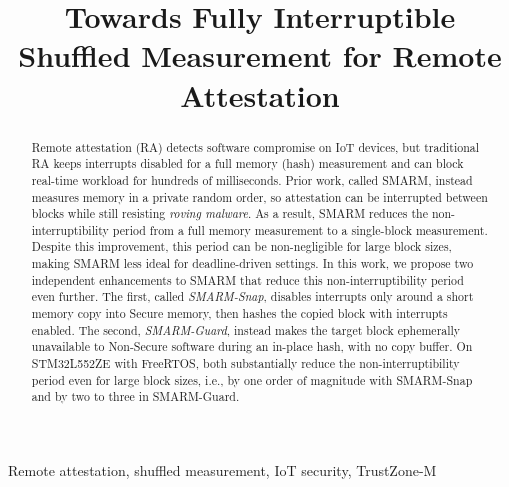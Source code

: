 \documentclass[conference]{IEEEtran}
\newcommand{\smarmcopy}{SMARM-Snap\xspace}
\newcommand{\smarmlock}{SMARM-Guard\xspace}
\begin{document}
\title{Towards Fully Interruptible Shuffled Measurement for Remote Attestation}


\maketitle

\begin{abstract}
Remote attestation (RA) detects software compromise on IoT devices, but
traditional RA keeps interrupts disabled for a full memory (hash) measurement and can block real-time workload for hundreds of milliseconds.
Prior work, called SMARM, instead measures memory in a private random order, so attestation can be interrupted between blocks while still resisting \emph{roving malware}.
As a result, SMARM reduces the non-interruptibility period from a full memory measurement to a single-block measurement.
Despite this improvement, this period can be non-negligible for large block sizes, making SMARM less ideal for deadline-driven settings.
In this work, we propose two independent enhancements to SMARM that reduce this non-interruptibility period even further.
The first, called \emph{\smarmcopy}, disables interrupts only around a short memory copy into Secure memory, then hashes the copied block with interrupts enabled.
The second, \emph{\smarmlock}, instead makes the target block ephemerally unavailable to Non-Secure software during an in-place hash, with no copy buffer.
On STM32L552ZE with FreeRTOS, both substantially reduce the non-interruptibility period even for large block sizes, i.e., by one order of magnitude with \smarmcopy{} and by two to three in \smarmlock.
\end{abstract}

\begin{IEEEkeywords}
Remote attestation, shuffled measurement, IoT security, TrustZone-M
\end{IEEEkeywords}
\end{document}
